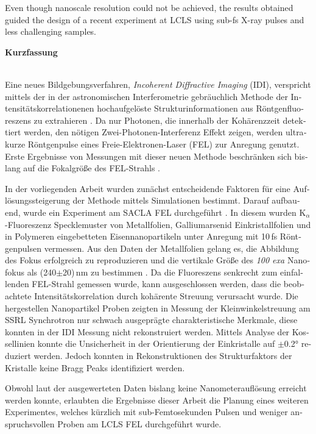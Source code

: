 Even though nanoscale resolution could not be achieved, the results obtained guided the design of a recent experiment at LCLS using sub-fs X-ray pulses and less challenging samples.





\clearpage
 
 \begin{otherlanguage}{german}
 \begin{Huge}
 	\textbf{Kurzfassung}\vspace{12mm}
 \end{Huge}
\\
Eine neues Bildgebungsverfahren, \textit{Incoherent Diffractive Imaging} (IDI), verspricht mittels der in der  astronomischen Interferometrie gebräuchlich Methode der Intensitätskorrelationenen  hochaufgelöste Strukturinformationen aus Röntgenfluoreszens zu extrahieren \cite{classen2017}. Da nur Photonen, die innerhalb der Kohärenzzeit detektiert werden, den nötigen Zwei-Photonen-Interferenz  Effekt zeigen, werden ultrakurze Röntgenpulse eines Freie-Elektronen-Laser (FEL) zur Anregung genutzt. Erste Ergebnisse von Messungen mit dieser neuen Methode beschränken sich bislang auf die Fokalgröße des FEL-Strahls \cite{nakumura2020}.

In der vorliegenden Arbeit wurden zunächst entscheidende Faktoren für eine Auflösungssteigerung der Methode mittels Simulationen bestimmt. Darauf aufbauend, wurde ein Experiment am SACLA FEL durchgeführt \cite{yabashi2015}. In diesem wurden K$_\alpha$-Fluoreszenz Specklemuster von Metallfolien, Galliumarsenid Einkristallfolien und in Polymeren eingebetteten Eisennanopartikeln unter Anregung mit 10\,fs Röntgenpulsen vermessen. Aus den Daten der Metallfolien gelang es, die Abbildung des Fokus erfolgreich zu reproduzieren und die vertikale Größe des \textit{100 exa} Nanofokus als (240$\pm$20)\,nm zu bestimmen \cite{yumoto2020}.  Da die Fluoreszens senkrecht zum einfallenden FEL-Strahl gemessen wurde, kann ausgeschlossen werden, dass die beobachtete Intensitätskorrelation durch kohärente Streuung verursacht wurde.  Die hergestellen Nanopartikel Proben zeigten in Messung der Kleinwinkelstreuung am SSRL Synchrotron nur schwach ausgeprägte charakteristische Merkmale, diese konnten in der IDI Messung nicht rekonstruiert werden. Mittels Analyse der Kossellinien konnte die Unsicherheit in der Orientierung der Einkristalle auf $\pm$0.2° reduziert werden. Jedoch konnten in Rekonstruktionen des Strukturfaktors der Kristalle keine Bragg Peaks identifiziert werden.

Obwohl laut der ausgewerteten Daten bislang keine Nanometerauflösung erreicht werden konnte,
erlaubten die Ergebnisse dieser Arbeit die Planung eines weiteren Experimentes, welches kürzlich   mit sub-Femtosekunden Pulsen und weniger anspruchsvollen Proben am  LCLS FEL durchgeführt wurde.
\end{otherlanguage}